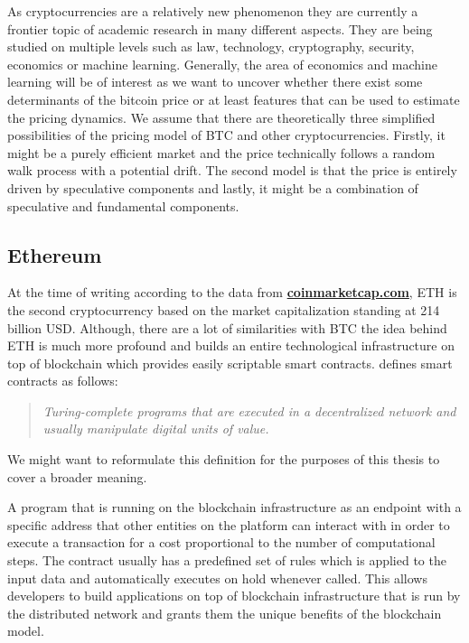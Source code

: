As cryptocurrencies are a relatively new phenomenon they are currently a frontier topic of academic 
research in many different aspects. They are being studied on multiple levels such as
law, technology, cryptography, security, economics or machine learning. Generally, the area
of economics and machine learning will be of interest as we want to uncover
whether there exist some determinants of the bitcoin price or at least features that can be used 
to estimate the pricing dynamics. We assume that there are theoretically three simplified 
possibilities of the pricing model 
of \ac{BTC} and other cryptocurrencies. Firstly, it might be a purely efficient market 
and the price technically follows a random walk process with a potential drift. 
The second model is that the price is entirely
driven by speculative components and lastly, it might be a combination of speculative and fundamental
components.


\subsection{Ethereum}
At the time of writing according to the data from 
\textbf{\href{https://coinmarketcap.com/}{coinmarketcap.com}}, 
\newline
\ac{ETH} 
is the second cryptocurrency 
based on the market capitalization standing at 214 billion USD. Although, there are a lot of 
similarities with \ac{BTC} the idea behind \ac{ETH} is much more profound and builds an entire
technological infrastructure on top of blockchain which provides easily
scriptable smart contracts. \cite{Tikhomirov2018} defines smart contracts as follows:

\begin{quote}
    \textit{Turing-complete programs that are executed in a 
    decentralized network and usually manipulate digital units of value.}
\end{quote}

We might want to reformulate this definition for the purposes
of this thesis to cover a broader meaning.

\begin{defin}\label{de:contract}
    A program that is running on the blockchain infrastructure as an endpoint
    with a specific address that other entities on the platform can interact
    with in order to execute a transaction for a cost proportional to the
    number of computational steps. The contract 
    usually has a predefined set of rules which is applied to the input data
    and automatically executes on hold whenever called. This allows developers
    to build applications on top of blockchain infrastructure that is run 
    by the distributed network and grants them the unique benefits
    of the blockchain model.
\end{defin}


